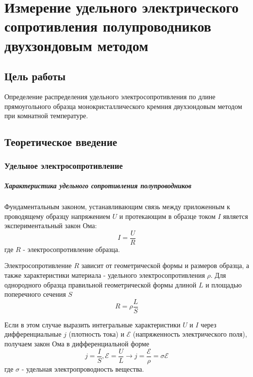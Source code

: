 \chapter{Измерение удельного электрического сопротивления полупроводников двухзондовым методом}

\section{Цель работы}
Определение распределения удельного электросопротивления по длине прямоугольного образца монокристаллического кремния двухзондовым методом при комнатной температуре.

\section{Теоретическое введение}
\subsection{Удельное электросопротивление}
\paragraph{Характеристика удельного сопротивления полупроводников}

Фундаментальным законом, устанавливающим связь между приложенным к проводящему образцу напряжением $U$ и протекающим в образце током $I$ является экспериментальный закон Ома:
\begin{equation}
I = \frac{U}{R}
\end{equation}
где $R$ - электросопротивление образца.

Электросопротивление $R$ зависит от геометрической формы и размеров образца, а также характеристики материала - удельного электросопротивления $\rho$. Для однородного образца правильной геометрической формы длиной $L$ и площадью поперечного сечения $S$
\begin{equation}
R = \rho \frac{L}{S}
\end{equation}

Если в этом случае выразить интегральные характеристики $U$ и $I$ через дифференциальные $j$ (плотность тока) и $\mathcal{E}$ (напряженность электрического поля), получаем закон Ома в дифференциальной форме
\begin{equation}
j = \frac{I}{S}, \mathcal{E} = \frac{U}{L} \rightarrow j = \frac{\mathcal{E}}{\rho} = \sigma \mathcal{E}
\end{equation}
где $\sigma$ - удельная электропроводность вещества.

